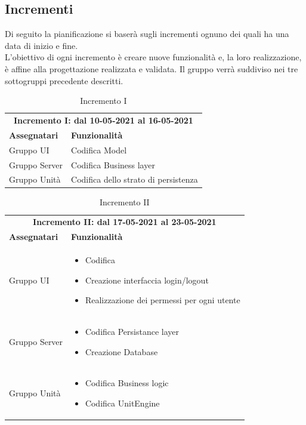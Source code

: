 \newpage

 \subsection{Incrementi}
 Di seguito la pianificazione si baserà sugli incrementi ognuno dei quali ha una data di inizio e fine.\\
  L'obiettivo di ogni incremento è creare nuove funzionalità e, la loro realizzazione, è affine alla progettazione realizzata e validata.
  Il gruppo verrà suddiviso nei tre sottogruppi precedente descritti.
  
  \begin{table} [h!]
  	\begin{center}
  		\begin{tabular} { m{4cm}  m{11cm}  }	
  			\multicolumn{2}{c}{	\textbf{Incremento I: dal 10-05-2021 al 16-05-2021}} \\
  			\rowcolor{lightgray}
  			\textbf{Assegnatari} & \textbf{Funzionalità} \\
  			Gruppo UI & Codifica Model\\
  			Gruppo Server & Codifica Business layer\\
  			Gruppo Unità & Codifica dello strato di persistenza\\	
  		\end{tabular}
  		\caption{Incremento I}
  	\end{center}
  \end{table}

 \begin{table} [h!]
 	\begin{center}
 		\begin{tabular} { m{4cm}  m{11cm}  }	
 			\multicolumn{2}{c}{	\textbf{Incremento II: dal 17-05-2021 al 23-05-2021}} \\
 			\rowcolor{lightgray}
 			\textbf{Assegnatari} & \textbf{Funzionalità} \\
 			Gruppo UI & \begin{itemize}
 				\item Codifica \glock{WebSocket}
 				\item Creazione interfaccia login/logout
 				\item Realizzazione dei permessi per ogni utente
 			\end{itemize}\\		
 			Gruppo Server & \begin{itemize}
 				\item Codifica Persistance layer
 				\item Creazione Database
 			\end{itemize}\\		
 			Gruppo Unità & \begin{itemize}
 				\item Codifica Business logic
 				\item Codifica UnitEngine
 			\end{itemize}\\		
 		\end{tabular}
 		\caption{Incremento II}
 	\end{center}
 \end{table}

